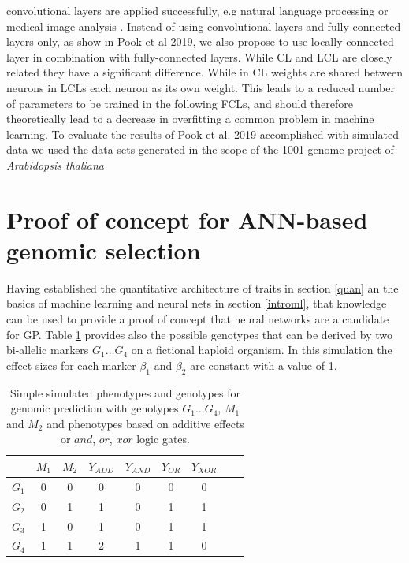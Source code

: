 convolutional layers are applied successfully, e.g natural language processing \cite{dos2014deep} or medical
image analysis \cite{litjens2017survey}. Instead of using convolutional layers and fully-connected layers
only, as show in Pook et al 2019, we also propose to use locally-connected layer in combination with
fully-connected layers. While CL and LCL are closely related they have a significant difference. While in CL
weights are shared between neurons in LCLs each neuron as its own weight. This leads to a reduced number of
parameters to be trained in the following FCLs, and should therefore theoretically lead to a decrease in
overfitting a common problem in machine learning. To evaluate the results of Pook et al. 2019 accomplished
with simulated data we used the data sets generated in the scope of the 1001 genome project of
\textit{Arabidopsis thaliana} \cite{1001genome}


\section{Proof of concept for ANN-based genomic selection} \label{POC}

Having established the quantitative architecture of traits in section \ref{quan} an the basics of machine
learning and neural nets in section \ref{introml}, that knowledge can be used to provide a proof of concept
that neural networks are a candidate for GP. Table \ref{tab:simmarker} provides also the possible genotypes
that can be derived by two bi-allelic markers $G_1 \dots G_4$ on a fictional haploid organism. In this
simulation the effect sizes for each marker $\beta_1$ and $\beta_2$ are constant with a value of 1.

\begin{table}[H]
 \caption{Simple simulated phenotypes and genotypes for genomic prediction with genotypes $G_1 \dots G_4$, $M_1$ and
  $M_2$ and phenotypes based on additive effects or $and$, $or$, $xor$ logic gates.}
\label{tab:simmarker}
\centering
\begin{tabular}{ l c c | c c c c c c }
 \toprule
 & $M_1$ & $M_2$ & $Y_{ADD}$ & $Y_{AND}$ & $Y_{OR}$ & $Y_{XOR}$\\
 \midrule
 \hline 
 $G_1$ & 0 & 0 & 0 & 0 & 0 & 0 \\
 $G_2$ & 0 & 1 & 1 & 0 & 1 & 1 \\
 $G_3$ & 1 & 0 & 1 & 0 & 1 & 1 \\
 $G_4$ & 1 & 1 & 2 & 1 & 1 & 0 \\
 \bottomrule
\end{tabular}
\end{table}

